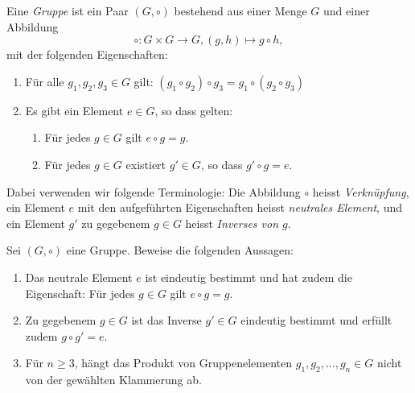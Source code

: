 \documentclass{book}
\begin{document}
\begin{defi}\label{defi:category} Eine {\em Gruppe} ist ein Paar $(G,\circ)$ bestehend aus einer Menge $G$ und einer Abbildung
    \[
        \circ: G \times G \to G, (g,h) \mapsto g \circ h, 
    \]
    mit der folgenden Eigenschaften: 
    \begin{enumerate}[label=(G\arabic*)]
        \item\label{it:g1} Für alle $g_1,g_2,g_3 \in G$ gilt: $(g_1 \circ g_2) \circ g_3 = g_1 \circ (g_2 \circ g_3)$
        \item\label{it:g2} Es gibt ein Element $e \in G$, so dass gelten:
    \begin{enumerate}[label=(G2.\arabic*)]
        \item\label{it:g21} Für jedes $g \in G$ gilt $e \circ g = g$.
        \item\label{it:g22} Für jedes $g \in G$ existiert $g' \in G$, so dass $g' \circ g = e$. 
    \end{enumerate}
    \end{enumerate}     
    Dabei verwenden wir folgende Terminologie: Die Abbildung $\circ$ heisst
    {\em Verknüpfung}, ein Element $e$ mit den aufgeführten Eigenschaften
    heisst {\em neutrales Element}, und ein Element $g'$ zu gegebenem $g \in G$
    heisst {\em Inverses von $g$}.
\end{defi}

\begin{prob}\label{prob:gruppe} Sei $(G,\circ)$ eine Gruppe. Beweise die folgenden Aussagen:
    \begin{enumerate}
        \item Das neutrale Element $e$ ist eindeutig bestimmt und hat zudem die Eigenschaft: Für jedes $g \in G$ gilt $e \circ g = g$.
        \item Zu gegebenem $g \in G$ ist das Inverse $g' \in G$ eindeutig bestimmt und erfüllt zudem $g \circ g' = e$. 
        \item Für $n \ge 3$, hängt das Produkt von Gruppenelementen $g_1, g_2, ..., g_n \in G$ nicht von der gewählten Klammerung ab.
    \end{enumerate}
\end{prob}
\end{document}
